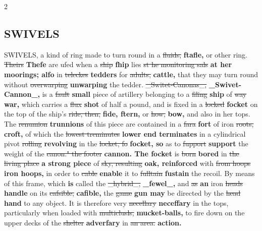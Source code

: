 \documentclass[10pt]{article}
\begin{document}
\begin{multicols}{2}
\subsection*{SWIVELS}
SWIVELS, a kind of ring made to turn round in a \sout{fluids,} \textbf{ftafle,} or other ring. \sout{Theirs} \textbf{Thefe} are ufed when a \sout{ship} \textbf{fhip} lies \sout{st he monitoring sals} \textbf{at her moorings; alfo} in \sout{teleckes} \textbf{tedders} for \sout{adults,} \textbf{cattle,} that they may turn round without \sout{overwarping} \textbf{unwarping} the tedder. \sout{\_Switet-Canonas\_,} \textbf{\_Swivet-Cannon\_,} is a \sout{fault} \textbf{small} piece of artillery belonging to a \sout{filing} \textbf{ship} of \sout{way} \textbf{war,} which carries a \sout{flux} \textbf{shot} of half a pound, and is fixed in a \sout{locked} \textbf{focket} on the top of the ship's \sout{ride, then,} \textbf{fide, ftern,} or \sout{how,} \textbf{bow,} and also in her tops. The \sout{renumion} \textbf{trunnions} of this piece are contained in a \sout{fara} \textbf{fort} of iron \sout{roots,} \textbf{croft,} of which the \sout{lowest treminutes} \textbf{lower end terminates} in a cylindrical pivot \sout{rolling} \textbf{revolving} in the \sout{locket, fo} \textbf{focket, so} as to \sout{fupport} \textbf{support} the weight of the \sout{canon." the footer} \textbf{cannon. The focket} is \sout{born} \textbf{bored} in \sout{the living place} \textbf{a strong piece} of \sout{sky, resulting} \textbf{oak, reinforced} with \sout{from hoops} \textbf{iron hoops,} in order to \sout{cable} \textbf{enable} it to \sout{fulltain} \textbf{fustain} the recoil. By means of this frame, which \textbf{is} called the \sout{\_hybrid\_,} \textbf{\_fewel\_,} and \sout{as} \textbf{an} iron \sout{heads} \textbf{handle} on its \sout{cafsible,} \textbf{cafible,} the \sout{game} \textbf{gun may} be directed by the \sout{head} \textbf{hand} to any object. It is therefore very \sout{necellary} \textbf{neceffary} in the tops, particularly when loaded with \sout{multiclusls,} \textbf{mucket-balls,} to fire down on the upper decks of the \sout{shelter} \textbf{adverfary} in \sout{an area.} \textbf{action.}


\end{multicols}
\end{document}
